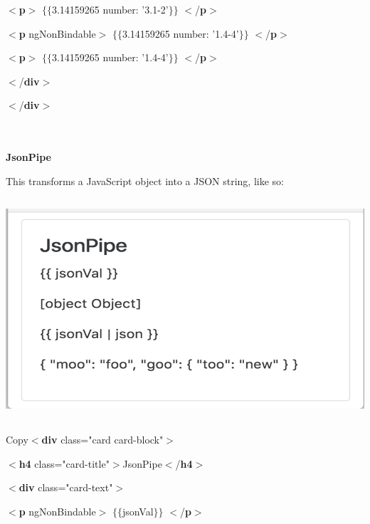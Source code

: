 \documentclass{article}
\begin{document}
$\mathrm{<}$\textbf{p}$\mathrm{>}$ $\mathrm{\{}$$\mathrm{\{}$3.14159265 {\textbar} number: '3.1-2'$\mathrm{\}}$$\mathrm{\}}$ $\mathrm{<}$/\textbf{p}$\mathrm{>}$

$\mathrm{<}$\textbf{p} ngNonBindable$\mathrm{>}$ $\mathrm{\{}$$\mathrm{\{}$3.14159265 {\textbar} number: '1.4-4'$\mathrm{\}}$$\mathrm{\}}$ $\mathrm{<}$/\textbf{p}$\mathrm{>}$

$\mathrm{<}$\textbf{p}$\mathrm{>}$ $\mathrm{\{}$$\mathrm{\{}$3.14159265 {\textbar} number: '1.4-4'$\mathrm{\}}$$\mathrm{\}}$ $\mathrm{<}$/\textbf{p}$\mathrm{>}$

$\mathrm{<}$/\textbf{div}$\mathrm{>}$

\noindent $\mathrm{<}$/\textbf{div}$\mathrm{>}$

\noindent 
\newpage
\noindent  \\ \\ {\large \textbf{JsonPipe}}

\noindent This transforms a JavaScript object into a JSON string, like so:

\begin{center}
	\noindent \includegraphics*[width=5.81in, height=3.24in]{IMG-03-04}
\end{center}

\noindent 

\noindent 

\noindent Copy$\mathrm{<}$\textbf{div} class="card card-block"$\mathrm{>}$

$\mathrm{<}$\textbf{h4} class="card-title"$\mathrm{>}$JsonPipe$\mathrm{<}$/\textbf{h4}$\mathrm{>}$

$\mathrm{<}$\textbf{div} class="card-text"$\mathrm{>}$

$\mathrm{<}$\textbf{p} ngNonBindable$\mathrm{>}$ $\mathrm{\{}$$\mathrm{\{}$jsonVal$\mathrm{\}}$$\mathrm{\}}$ $\mathrm{<}$/\textbf{p}$\mathrm{>}$
\end{document}
